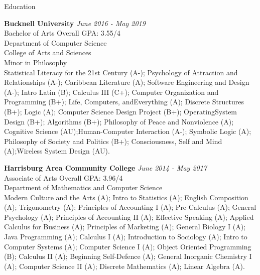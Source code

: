 \documentclass{resume} %
\begin{document}
\begin{rSection}{Education}

{\bf Bucknell University} \hfill {\em June 2016 - May 2019} 
\\ Bachelor of Arts \hfill { Overall GPA: 3.55/4}
\\ Department of Computer Science 
\\ College of Arts and Sciences
\\ Minor in Philosophy \smallskip \\
Statistical Literacy for the 21st Century (A-); Psychology of Attraction and Relationships (A-); Caribbean Literature (A); Software Engineering and Design (A-); Intro Latin (B); Calculus III (C+); Computer Organization and Programming (B+); Life, Computers, andEverything (A); Discrete Structures (B+); Logic (A); Computer Science Design Project (B+); OperatingSystem Design (B+); Algorithms (B+); Philosophy of Peace and Nonviolence (A); Cognitive Science (AU);Human-Computer Interaction (A-); Symbolic Logic (A); Philosophy of Society and Politics (B+); Consciousness, Self and Mind (A);Wireless System Design (AU).


{\bf Harrisburg Area Community College} \hfill {\em June 2014 - May 2017} 
\\ Associate of Arts \hfill { Overall GPA: 3.96/4}
\\ Department of Mathematics and Computer Science 
\smallskip \\
Modern Culture and the Arts (A); Intro to Statistics (A); English Composition (A); Trigonometry (A); Principles of Accounting I (A); Pre-Calculus (A); General Psychology (A); Principles of Accounting II (A); Effective Speaking (A);  Applied Calculus for Business (A); Principles of Marketing (A); General Biology I (A); Java Programming (A); Calculus I (A); Introduction to Sociology (A); Intro to Computer Systems (A); Computer Science I (A); Object Oriented Programming (B); Calculus II (A); Beginning Self-Defence (A); General Inorganic Chemistry I (A); Computer Science II (A); Discrete Mathematics (A); Linear Algebra (A).



\end{rSection}
\end{document}
